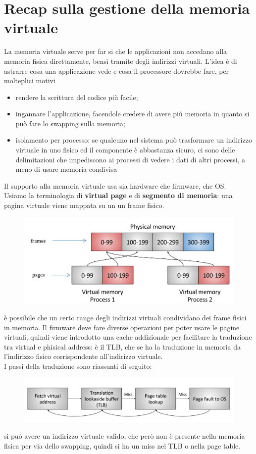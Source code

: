 \documentclass[12pt, oneside]{extbook} %
\begin{document}
\section{Recap sulla gestione della memoria virtuale}
La memoria virtuale serve per far si che le applicazioni non accedano alla memoria fisica direttamente, bensì tramite degli indirizzi virtuali. L'idea è di astrarre cosa una applicazione vede e cosa il processore dovrebbe fare, per molteplici motivi
\begin{itemize}
\item rendere la scrittura del codice più facile;
\item ingannare l'applicazione, facendole credere di avere più memoria in quanto si può fare lo swapping sulla memoria;
\item isolamento per processo: se qualcuno nel sistema può trasformare un indirizzo virtuale in uno fisico ed il componente è abbastanza sicuro, ci sono delle delimitazioni che impediscono ai processi di vedere i dati di altri processi, a meno di usare memoria condivisa
\end{itemize}
Il supporto alla memoria virtuale usa sia hardware che firmware, che OS.\\ Usiamo la terminologia di \textbf{virtual page} e di \textbf{segmento di memoria}: una pagina virtuale viene mappata su un un frame fisico.
\begin{figure}[!h]
	\includegraphics[scale=0.3]{immagini/frame_pages_mapping.png}
\end{figure}
è possibile che un certo range degli indirizzi virtuali condividano dei frame fisici in memoria. Il firmware deve fare diverse operazioni per poter usare le pagine virtuali, quindi viene introdotto una cache addizionale per facilitare la traduzione tra virtual e phisical address: è il TLB, che se ha la traduzione in memoria da l'indirizzo fisico corrispondente all'indirizzo virtuale.\\ I passi della traduzione sono riassunti di seguito:
\begin{figure}[!h]
	\includegraphics[scale=0.3]{immagini/virt_to_phis.png}
\end{figure}
si può avere un indirizzo virtuale valido, che però non è presente nella memoria fisica per via dello swapping, quindi si ha un miss nel TLB o nella page table.
\end{document}
